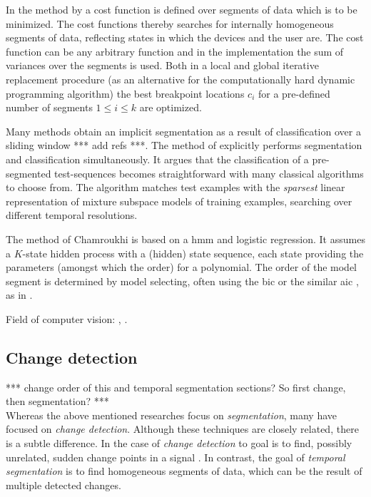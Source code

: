 In the method by \cite{himberg2001time} a cost function is defined over segments of data which is to be minimized.
The cost functions thereby searches for internally homogeneous segments of data, reflecting states in which the devices and the user are.
The cost function can be any arbitrary function and in the implementation the sum of variances over the segments is used.
Both in a local and global iterative replacement procedure (as an alternative for the computationally hard dynamic programming algorithm) the best breakpoint locations $c_i$ for a pre-defined number of segments $1 \leq i \leq k$ are optimized.

Many methods obtain an implicit segmentation as a result of classification over a sliding window *** add refs ***.
The method of \cite{yang2008distributed} explicitly performs segmentation and classification simultaneously.
It argues that the classification of a pre-segmented test-sequences becomes straightforward with many classical algorithms to choose from.
The algorithm matches test examples with the \emph{sparsest} linear representation of mixture subspace models of training examples, searching over different temporal resolutions.

The method of Chamroukhi \etal \cite{chamroukhi2013joint} is based on a \gls{hmm} and logistic regression.
It assumes a $K$-state hidden process with a (hidden) state sequence, each state providing the parameters (amongst which the order) for a polynomial.
The order of the model segment is determined by model selecting, often using the \gls{bic} or the similar \gls{aic} \cite{akaike1974new}, as in \cite{he2008activity}.

Field of computer vision: \cite{zhou2008aligned}, \cite{li2007segmentation}.

\subsection{Change detection}\label{subsec:change_detection}
*** change order of this and temporal segmentation sections? So first change, then segmentation? *** \\
Whereas the above mentioned researches focus on \emph{segmentation}, many have focused on \emph{change detection}.
Although these techniques are closely related, there is a subtle difference.
In the case of \emph{change detection} to goal is to find, possibly unrelated, sudden change points in a signal \cite{takeuchi2006unifying}.
In contrast, the goal of \emph{temporal segmentation} is to find homogeneous segments of data, which can be the result of multiple detected changes.


